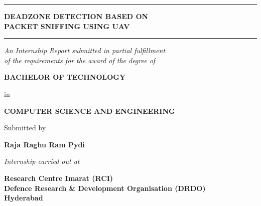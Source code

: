 
\begin{titlepage}
\centering
\thispagestyle{empty}

{\color{navy}\rule{\textwidth}{2pt}}
\vspace{0.4cm}

{\sffamily\bfseries\LARGE\color{navy}
DEADZONE DETECTION BASED ON\\[4pt]
PACKET SNIFFING USING UAV\par}

\vspace{0.3cm}
{\color{navy}\rule{\textwidth}{2pt}}

\vspace{1.0cm}
{\itshape\large An Internship Report submitted in partial fulfillment\\
of the requirements for the award of the degree of\par}

\vspace{0.8cm}
{\sffamily\bfseries\Large\color{steel}
BACHELOR OF TECHNOLOGY\par}
\vspace{4pt}
{\sffamily\large\color{steel} in\par}
\vspace{4pt}
{\sffamily\bfseries\Large\color{steel}
COMPUTER SCIENCE AND ENGINEERING\par}

\vspace{1.2cm}
{\large Submitted by\par}
\vspace{6pt}
{\sffamily\bfseries\LARGE\color{navy} Raja Raghu Ram Pydi\par}

\vspace{0.8cm}
{\itshape\normalsize Internship carried out at\par}
\vspace{4pt}
{\bfseries\large Research Centre Imarat (RCI)\\
Defence Research \& Development Organisation (DRDO)\\
Hyderabad\par}

\vfill


\end{titlepage}

